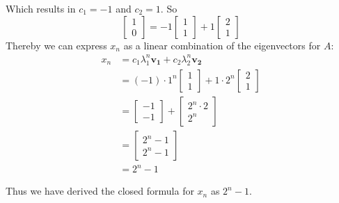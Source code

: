 Which results in $c_1 = -1$ and $c_2 = 1$. So
\[
	\begin{bmatrix}1\\0\end{bmatrix} = -1\begin{bmatrix}1\\1\end{bmatrix} + 1\begin{bmatrix}2\\1\end{bmatrix}
\]
Thereby we can express $x_n$ as a linear combination of the eigenvectors for $A$:
\begin{align*}
	x_n & = c_1\lambda_1^n\mathbf{v_1} + c_2\lambda_2^n\mathbf{v_2}                                    \\
	    & = (-1)\cdot 1^n\begin{bmatrix}1\\1\end{bmatrix} + 1\cdot 2^n\begin{bmatrix}2\\1\end{bmatrix} \\
	    & = \begin{bmatrix}-1\\-1\end{bmatrix} + \begin{bmatrix}2^n\cdot 2\\2^n\end{bmatrix}           \\
	    & = \begin{bmatrix}2^n-1\\2^n-1\end{bmatrix}                                                   \\
	    & =2^n-1
\end{align*}

Thus we have derived the closed formula for $x_n$ as $2^n-1$.
